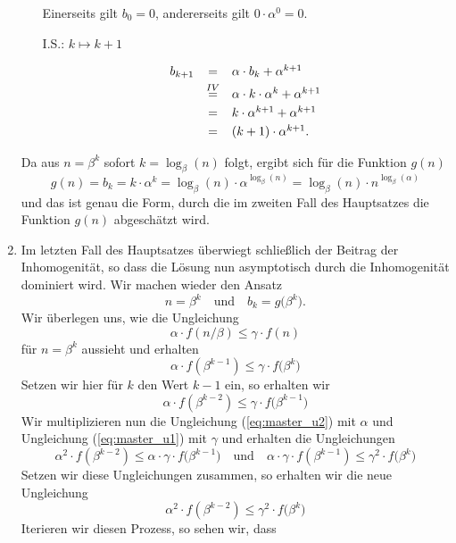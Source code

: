 \begin{enumerate}
\begin{enumerate}
             Einerseits gilt $b_0 = 0$, andererseits gilt $0 \cdot \alpha^0 = 0$.

\item[I.S.:] $k \mapsto k+1$

            \[
            \begin{array}[t]{lcl}
              b_{k+1} &               =  & \alpha \cdot b_k + \alpha^{k+1}              \\[0.1cm] 
                      & \stackrel{IV}{=} & \alpha \cdot k \cdot \alpha^k + \alpha^{k+1} \\[0.1cm]  
                      &               =  & k \cdot \alpha^{k+1} + \alpha^{k+1}          \\[0.1cm] 
                      &               =  & (k + 1) \cdot \alpha^{k+1}. 
            \end{array}
            \]
\end{enumerate}
Da aus $n = \beta^k$ sofort $k = \log_\beta(n)$ folgt, ergibt sich f\"ur die Funktion
$g(n)$ 
\[ g(n) = b_k = k \cdot \alpha^k = \log_\beta(n) \cdot \alpha^{\log_\beta(n)} = \log_\beta(n) \cdot
n^{\log_\beta(\alpha)} \]
und das ist genau die Form, durch die im zweiten Fall des Hauptsatzes die Funktion
$g(n)$ abgesch\"atzt wird.
\item
Im letzten Fall des Hauptsatzes \"uberwiegt schlie{\ss}lich der Beitrag der Inhomogenit\"at, so dass die L\"osung 
nun asymptotisch durch die Inhomogenit\"at dominiert wird.
Wir machen wieder den Ansatz 
\[ n = \beta^k \quad \mbox{und} \quad b_k = g\bigl(\beta^k\bigr). \]
Wir \"uberlegen uns, wie die Ungleichung 
\[ \alpha \cdot f\left(n/\beta\right) \leq \gamma \cdot f(n) \]
f\"ur $n = \beta^k$ aussieht und erhalten
\begin{equation}
  \label{eq:master_u1}
 \alpha \cdot f\left(\beta^{k-1}\right) \leq \gamma \cdot f\bigl(\beta^k\bigr) 
\end{equation}
Setzen wir hier f\"ur $k$ den Wert $k-1$ ein, so erhalten wir
\begin{equation}
  \label{eq:master_u2}
 \alpha \cdot f\left(\beta^{k-2}\right) \leq \gamma \cdot f\bigl(\beta^{k-1}\bigr) 
\end{equation}
Wir multiplizieren nun die Ungleichung (\ref{eq:master_u2}) mit $\alpha$ und
Ungleichung (\ref{eq:master_u1}) mit $\gamma$ und erhalten die Ungleichungen
\[ \alpha^2 \cdot f\left(\beta^{k-2}\right) \leq \alpha \cdot \gamma \cdot f\bigl(\beta^{k-1}\bigr) 
   \quad \mbox{und} \quad
   \alpha \cdot \gamma \cdot f\left(\beta^{k-1}\right) \leq \gamma^2 \cdot f\bigl(\beta^k\bigr) 
\]
Setzen wir diese Ungleichungen zusammen, so erhalten wir die neue Ungleichung
\[ \alpha^2 \cdot f\left(\beta^{k-2}\right) \leq \gamma^2 \cdot f\bigl(\beta^k\bigr) \]
Iterieren wir diesen Prozess, so sehen wir, dass 


\end{enumerate}

